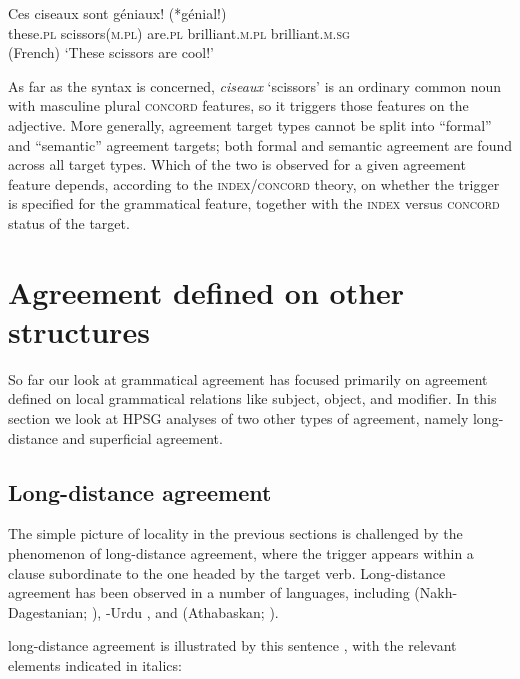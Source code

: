 \documentclass[output=paper
 	        ,biblatex
                ,babelshorthands
                ,newtxmath
                ,draftmode
                ,colorlinks, citecolor=brown
]{langscibook}
\begin{document}
\begin{exe} 
\ex\label{ciseaux}
\gll Ces	       ciseaux	               sont	       g\'{e}niaux!	       (*g\'{e}nial!) \\
     these.\textsc{pl} scissors(\textsc{m.pl}) are.\textsc{pl} brilliant.\textsc{m.pl} \hphantom{(*}brilliant.\textsc{m.sg} \\\hfill(French)
\glt		`These scissors are cool!’ 
\end{exe}

\noindent
As far as the syntax is concerned, \textit{ciseaux} `scissors’ is an ordinary common noun with masculine plural \textsc{concord} features, so it triggers those features on the adjective.  More generally, agreement target types cannot be split into ``formal'' and ``semantic'' agreement targets; both formal and semantic agreement are found across all target types.  Which of the two is observed for a given agreement feature depends, according to the  \textsc{index/concord}  theory,  on whether the trigger is specified for the grammatical feature, together with the  \textsc{index}  versus  \textsc{concord}  status of the target.  
 

\section{Agreement defined on other structures}

So far our look at grammatical agreement has focused primarily on agreement defined on local grammatical relations like subject, object, and modifier.  In this section we look at HPSG analyses of two other types of agreement, namely long-distance and superficial agreement.  

\subsection{Long-distance agreement}
\label{LDA}

The simple picture of locality in the previous sections is challenged by the phenomenon of
long-distance agreement, where the trigger appears within a clause subordinate to the one headed by
the target verb.  Long-distance agreement has been observed in a number of languages, including
 (Nakh-Dagestanian; \citealt{polinsky+potsdam:2001}), -Urdu \citep{bhatt:2005},
and  (Athabaskan; \citealt{bruening:2001,LeSourd:2018}).

 long-distance agreement is illustrated by this sentence
\citep[example\,(5)]{LeSourd:2018}, with the relevant elements indicated in italics: 
\end{document}

